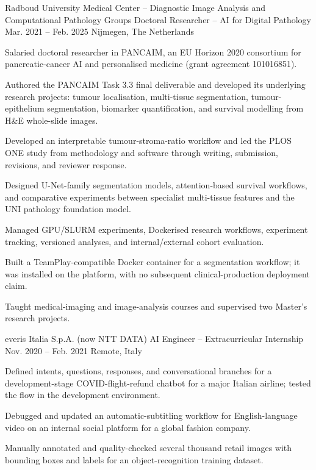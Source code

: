 \begin{cventries}
\cventry
  {Radboud University Medical Center -- Diagnostic Image Analysis and Computational Pathology Groups}
  {Doctoral Researcher -- AI for Digital Pathology}
  {Mar. 2021 -- Feb. 2025}
  {Nijmegen, The Netherlands}
  {
    \begin{cvitems}
      \item {Salaried doctoral researcher in PANCAIM, an EU Horizon 2020 consortium for pancreatic-cancer AI and personalised medicine (grant agreement 101016851).}
      \item {Authored the PANCAIM Task 3.3 final deliverable and developed its underlying research projects: tumour localisation, multi-tissue segmentation, tumour-epithelium segmentation, biomarker quantification, and survival modelling from H\&E whole-slide images.}
      \item {Developed an interpretable tumour-stroma-ratio workflow and led the PLOS ONE study from methodology and software through writing, submission, revisions, and reviewer response.}
      \item {Designed U-Net-family segmentation models, attention-based survival workflows, and comparative experiments between specialist multi-tissue features and the UNI pathology foundation model.}
      \item {Managed GPU/SLURM experiments, Dockerised research workflows, experiment tracking, versioned analyses, and internal/external cohort evaluation.}
      \item {Built a TeamPlay-compatible Docker container for a segmentation workflow; it was installed on the platform, with no subsequent clinical-production deployment claim.}
      \item {Taught medical-imaging and image-analysis courses and supervised two Master's research projects.}
    \end{cvitems}
  }

\cventry
  {everis Italia S.p.A. (now NTT DATA)}
  {AI Engineer -- Extracurricular Internship}
  {Nov. 2020 -- Feb. 2021}
  {Remote, Italy}
  {
    \begin{cvitems}
      \item {Defined intents, questions, responses, and conversational branches for a development-stage COVID-flight-refund chatbot for a major Italian airline; tested the flow in the development environment.}
      \item {Debugged and updated an automatic-subtitling workflow for English-language video on an internal social platform for a global fashion company.}
      \item {Manually annotated and quality-checked several thousand retail images with bounding boxes and labels for an object-recognition training dataset.}
    \end{cvitems}
  }


\end{cventries}
